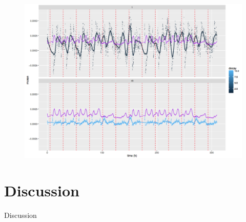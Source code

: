 \begin{figure}
\includegraphics[width=\textwidth,height=0.6\textheight]{Figures/TransportationEquilibrium/gr5}
\caption{}
\label{fig:fig-5}
\end{figure}




\section{Discussion}{Discussion}


